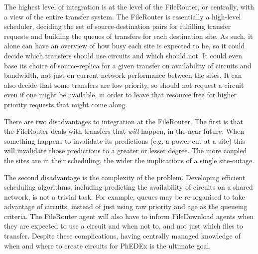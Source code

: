 The highest level of integration is at the level of the FileRouter, or centrally, with a view of the entire transfer system. The FileRouter is essentially a high-level scheduler, deciding the set of source-destination pairs for fulfilling transfer requests and building the queues of transfers for each destination site. As such, it alone can have an overview of how busy each site is expected to be, so it could decide which transfers should use circuits and which should not. It could even base its choice of source-replica for a given transfer on availability of circuits and bandwidth, not just on current network performance between the sites. It can also decide that some transfers are low priority, so should not request a circuit even if one might be available, in order to leave that resource free for higher priority requests that might come along.

There are two disadvantages to integration at the FileRouter. The first is that the FileRouter deals with transfers that \emph{will} happen, in the near future. When something happens to invalidate its predictions (e.g. a power-cut at a site) this will invalidate those predictions to a greater or lesser degree. The more coupled the sites are in their scheduling, the wider the implications of a single site-outage.

The second disadvantage is the complexity of the problem. Developing efficient scheduling algorithms, including predicting the availability of circuits on a shared network, is not a trivial task. For example, queues may be re-organised to take advantage of circuits, instead of just using raw priority and age as the queueing criteria. The FileRouter agent will also have to inform FileDownload agents when they are expected to use a circuit and when not to, and not just which files to transfer. Despite these complications, having centrally managed knowledge of when and where to create circuits for PhEDEx is the ultimate goal.